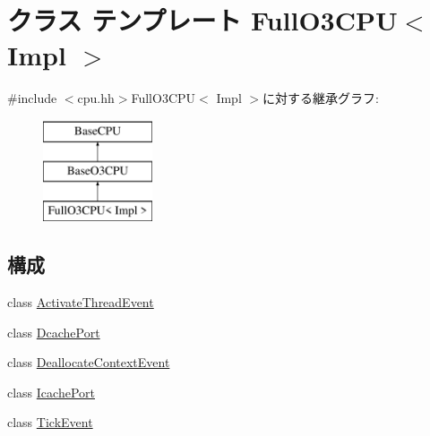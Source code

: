 \hypertarget{classFullO3CPU}{
\section{クラス テンプレート FullO3CPU$<$ Impl $>$}
\label{classFullO3CPU}
}


{\ttfamily \#include $<$cpu.hh$>$}FullO3CPU$<$ Impl $>$に対する継承グラフ:\begin{figure}[H]
\begin{center}
\leavevmode
\includegraphics[height=3cm]{classFullO3CPU}
\end{center}
\end{figure}
\subsection*{構成}
\begin{DoxyCompactItemize}
\item 
class \hyperlink{classFullO3CPU_1_1ActivateThreadEvent}{ActivateThreadEvent}
\item 
class \hyperlink{classFullO3CPU_1_1DcachePort}{DcachePort}
\item 
class \hyperlink{classFullO3CPU_1_1DeallocateContextEvent}{DeallocateContextEvent}
\item 
class \hyperlink{classFullO3CPU_1_1IcachePort}{IcachePort}
\item 
class \hyperlink{classFullO3CPU_1_1TickEvent}{TickEvent}
\end{DoxyCompactItemize}
